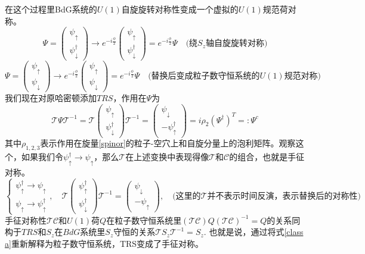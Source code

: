 \documentclass[a4paper]{article}
\numberwithin{equation}{subsection}
\newcommand{\mT}{\mathcal{T}}
\newcommand{\mC}{\mathcal{C}}
\begin{document}
在这个过程里BdG系统的$U(1)$自旋旋转对称性变成一个虚拟的$U(1)$规范荷对称。
\begin{equation}
    \Psi=\begin{pmatrix}
        \psi_\uparrow\\
        \psi_\downarrow^\dagger
    \end{pmatrix}\rightarrow e^{-i\frac{\phi}{2}}\begin{pmatrix}
        \psi_\uparrow\\
        \psi_\downarrow^\dagger
    \end{pmatrix}=e^{-i\frac{\phi}{2}}\Psi\quad\text{(绕$S_z$轴自旋旋转对称)}
\end{equation}
\begin{equation}
    \Psi=\begin{pmatrix}
        \psi_\uparrow\\
        \psi_\downarrow
    \end{pmatrix}\rightarrow e^{-i\frac{\phi}{2}}\begin{pmatrix}
        \psi_\uparrow\\
        \psi_\downarrow
    \end{pmatrix}=e^{-i\frac{\phi}{2}}\Psi\quad\text{(替换后变成粒子数守恒系统的$U(1)$规范对称)}
\end{equation}
我们现在对原哈密顿添加$TRS$，作用在$\Psi$为
\begin{equation}
    \mT\Psi \mT^{-1}=\mT\begin{pmatrix}
        \psi_\uparrow\\
        \psi_\downarrow^\dagger
    \end{pmatrix}\mT^{-1}=\begin{pmatrix}
        \psi_\downarrow\\
        -\psi_\uparrow^\dagger
    \end{pmatrix}=i\rho_2(\Psi^\dagger)^T=:\Psi^c
\end{equation}
其中$\rho_{1,2,3}$表示作用在旋量\eqref{spinor}的粒子-空穴上和自旋分量上的泡利矩阵。观察这个，如果我们令$\psi_\uparrow^\dagger\rightarrow\psi_\uparrow$，那么$\mT$在上述变换中表现得像$\mT$和$\mC$的组合，也就是手征对称。
\begin{equation}
    \begin{cases}
        \psi_\uparrow^\dagger\rightarrow\psi_\uparrow\\
        \psi_\uparrow\rightarrow\psi_\uparrow^\dagger
    \end{cases},\quad \mT \begin{pmatrix}
        \psi_\uparrow^\dagger\\
        \psi_\downarrow^\dagger
    \end{pmatrix}\mT^{-1}=\begin{pmatrix}
        \psi_\downarrow\\
        -\psi_\uparrow
    \end{pmatrix},\quad\text{(这里的$\mT$并不表示时间反演，表示替换后的对称性)}
\end{equation}
手征对称性$\mT\mC$和$U(1)$荷$Q$在粒子数守恒系统里$(\mT\mC)Q(\mT\mC)^{-1}=Q$的关系同构于$TRS$和$S_z$在$BdG$系统里$S_z$守恒的关系$\mT S_z\mT^{-1}=S_z$. 也就是说，通过将式\eqref{class a}重新解释为粒子数守恒系统，TRS变成了手征对称。
\end{document}
